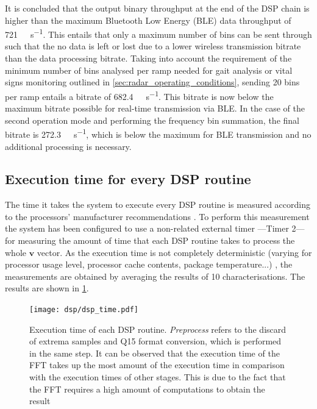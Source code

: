 It is concluded that the output binary throughput at the end of the DSP chain is higher than the maximum Bluetooth Low Energy (BLE) data throughput of \SI{721}{\kilo\bit\per\second}. This entails that only a maximum number of bins can be sent through such that the no data is left or lost due to a lower wireless transmission bitrate than the data processing bitrate. Taking into account the requirement of the minimum number of bins analysed per ramp needed for gait analysis or vital signs monitoring outlined in \cref{sec:radar_operating_conditions}, sending 20 bins per ramp entails a bitrate of \SI{682.4}{\kilo\bit\per\second}. This bitrate is now below the maximum bitrate possible for real-time transmission via BLE. In the case of the second operation mode and performing the frequency bin summation, the final bitrate is \SI{272.3}{\kilo\bit\per\second}, which is below the maximum for BLE transmission and no additional processing is necessary.

\subsection{Execution time for every DSP routine}

The time it takes the system to execute every DSP routine is measured according to the processors' manufacturer recommendations \cite{ARM2020}. To perform this measurement the system has been configured to use a non-related external timer ---Timer 2--- for measuring the amount of time that each DSP routine takes to process the whole $\mathbf{v}$ vector. As the execution time is not completely deterministic (varying for processor usage level, processor cache contents, package temperature...) \cite{ARM2020} %
, the measurements are obtained by averaging the results of 10 characterisations. The results are shown in \cref{fig:firmware_dsp_time}.

\begin{figure}[ht]
	\centering
	\texttt{[image: dsp/dsp\_time.pdf]}
	\caption{Execution time of each DSP routine. \textit{Preprocess} refers to the discard of extrema samples and Q15 format conversion, which is performed in the same step. It can be observed that the execution time of the FFT takes up the most amount of the execution time in comparison with the execution times of other stages. This is due to the fact that the FFT requires a high amount of computations to obtain the result}
	\label{fig:firmware_dsp_time}
\end{figure}

